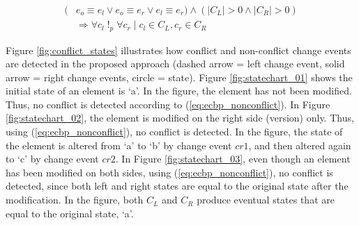 \begin{equation} \label{eq:ecbp_pseudoconflict}
\begin{split}
(& e_{o} \equiv e_{l} \vee e_{o} \equiv e_{r} \vee e_{l} \equiv e_{r}) \wedge (|C_{L}| > 0 \wedge |C_{R}| > 0)\\
& \Rightarrow \forall c_{l} \;!_{p}\; \forall c_{r} \;|\; c_{l} \in C_{L}, c_{r} \in C_{R}
\end{split}
\end{equation}

Figure \ref{fig:conflict_states} illustrates how conflict and non-conflict change events are detected in the proposed approach (dashed arrow = left change event, solid arrow = right change events, circle = state). Figure \ref{fig:statechart_01} shows the initial state of an element is ‘a’. In the figure, the element has not been modified. Thus, no conflict is detected according to (\ref{eq:ecbp_nonconflict}). In Figure \ref{fig:statechart_02}, the element is modified on the right side (version) only. Thus, using (\ref{eq:ecbp_nonconflict}), no conflict is detected. In the figure, the state of the element is altered from ‘a’ to ‘b’ by change event $cr1$, and then altered again to ‘c’ by change event $cr2$. In Figure \ref{fig:statechart_03}, even though an element has been modified on both sides, using (\ref{eq:ecbp_nonconflict}), no conflict is detected, since both left and right states are equal to the original state after the modification. In the figure, both $C_{L}$ and $C_{R}$ produce eventual states that are equal to the original state, ‘a’.

